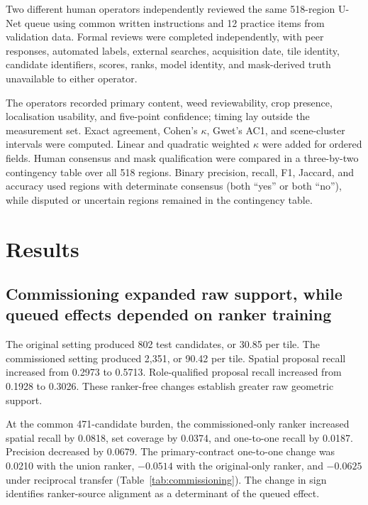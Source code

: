 \documentclass[preprint,12pt]{elsarticle}
\begin{document}
Two different human operators independently reviewed the same 518-region U-Net queue using common written instructions and 12 practice items from validation data. Formal reviews were completed independently, with peer responses, automated labels, external searches, acquisition date, tile identity, candidate identifiers, scores, ranks, model identity, and mask-derived truth unavailable to either operator.

The operators recorded primary content, weed reviewability, crop presence, localisation usability, and five-point confidence; timing lay outside the measurement set. Exact agreement, Cohen's $\kappa$, Gwet's AC1, and scene-cluster intervals were computed. Linear and quadratic weighted $\kappa$ were added for ordered fields. Human consensus and mask qualification were compared in a three-by-two contingency table over all 518 regions. Binary precision, recall, F1, Jaccard, and accuracy used regions with determinate consensus (both ``yes'' or both ``no''), while disputed or uncertain regions remained in the contingency table.

\section{Results}

\subsection{Commissioning expanded raw support, while queued effects depended on ranker training}

The original setting produced 802 test candidates, or 30.85 per tile. The commissioned setting produced 2,351, or 90.42 per tile. Spatial proposal recall increased from 0.2973 to 0.5713. Role-qualified proposal recall increased from 0.1928 to 0.3026. These ranker-free changes establish greater raw geometric support.

At the common 471-candidate burden, the commissioned-only ranker increased spatial recall by 0.0818, set coverage by 0.0374, and one-to-one recall by 0.0187. Precision decreased by 0.0679. The primary-contract one-to-one change was 0.0210 with the union ranker, $-0.0514$ with the original-only ranker, and $-0.0625$ under reciprocal transfer (Table~\ref{tab:commissioning}). The change in sign identifies ranker-source alignment as a determinant of the queued effect.
\end{document}
